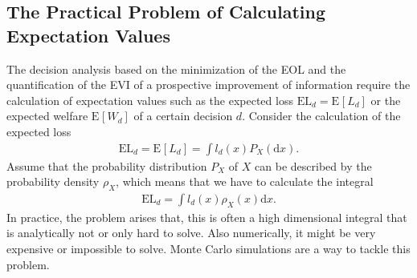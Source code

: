 \documentclass[a4paper,10pt,twoside,pagesize,abstracton]{scrartcl}
\renewcommand{\d}{\mathrm{d}\!} %
\newcommand{\E}[2][]{\mathrm{E}_{#1}\left[#2\right]} %
\newcommand{\EL}{\mathrm{EL}} %
\theoremstyle{plain}%
\theoremstyle{definition}
\theoremstyle{remark}
\begin{document}
\subsection{The Practical Problem of Calculating Expectation Values}
The decision analysis based on the minimization of the EOL and the quantification of the EVI of a prospective improvement of information require the calculation of expectation values such as the expected loss $\EL_d = \E{L_d}$ or the expected welfare $\E{W_d}$ of a certain decision $d$.  
Consider the calculation of the expected loss
\begin{align}
    \label{eqn:ELdIntPdx}
  \EL_d = \E{L_d} = \int l_d(x) P_X(\d x).
\end{align}
Assume that the probability distribution $P_X$ of $X$ can be described by the probability density $\rho_X$, which means that we have to calculate the integral
\begin{align}
  \EL_d =  \int l_d(x) \rho_X(x) \d x.
\end{align}
In practice, the problem arises that, this is often a high dimensional integral that is analytically not or only hard to solve. Also numerically, it might be very expensive or impossible to solve. Monte Carlo simulations are a way to tackle this problem.
\end{document}
